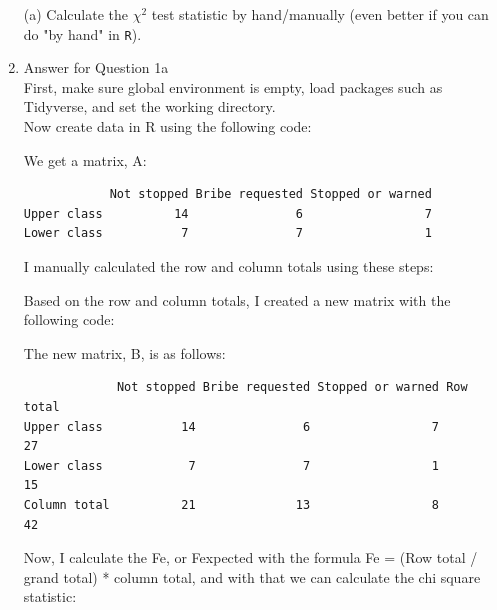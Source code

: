 \documentclass[12pt,letterpaper]{article}
\begin{document}
\begin{enumerate}
	
	\item [(a)]
	Calculate the $\chi^2$ test statistic by hand/manually (even better if you can do "by hand" in \texttt{R}).\\
	\vspace{7cm}
	
	\item
Answer for Question 1a\\
\noindent First, make sure global environment is empty, load packages such as Tidyverse, and set the working directory.\\ 
\noindent Now create data in R using the following code:\\
\vspace{.5cm}
  
\vspace{.5cm}
\noindent We get a matrix, A:\\
\begin{verbatim}
            Not stopped Bribe requested Stopped or warned
Upper class          14               6                 7
Lower class           7               7                 1
\end{verbatim}            
\noindent I manually calculated the row and column totals using these steps:\\
\vspace{.5cm}
  
\vspace{.5cm}
\noindent Based on the row and column totals, I created a new matrix with the following code:\\
\vspace{.5cm}
  
\vspace{.5cm}
\noindent The new matrix, B, is as follows:\\
\begin{verbatim}
             Not stopped Bribe requested Stopped or warned Row total
Upper class           14               6                 7        27
Lower class            7               7                 1        15
Column total          21              13                 8        42
\end{verbatim}
\vspace{.3cm}
\noindent Now, I calculate the Fe, or Fexpected with the formula Fe = (Row total / grand total) * column total, and with that we can calculate the chi square statistic:\\

\end{enumerate}
\end{document}
